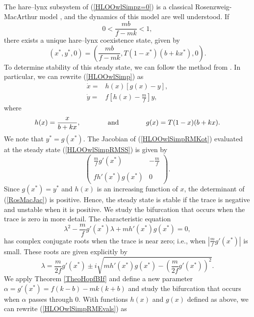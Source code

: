\documentclass[12pt]{UOthesis}
\theoremstyle{remarkstyle}
\begin{document}
The hare--lynx subsystem of (\ref{HLOOwlSimpz=0}) is a classical Rosenzweig-MacArthur model \cite{RosMac}, and the dynamics of this model are well understood. If
$$0<\frac{mb}{f-mk}<1,$$
there exists a unique hare--lynx coexistence state, given by
\begin{equation}
(x^*,y^*,0)=\left(\frac{mb}{f-mk}, T(1-x^*)(b+kx^*),0\right).
\label{HLOOwlSimpRMSS}
\end{equation}
To determine stability of this steady state, we can follow the method from \cite{Kot}. In particular, we can rewrite (\ref{HLOOwlSimp}) as
\begin{equation}
	\begin{split}
		\dot{x}=& h(x)\left[g(x)-y\right],\\
		\dot{y}=& f\left[h(x)-\frac{m}{f}\right]y,
	\end{split}
	\label{HLOOwlSimpRMKot}
\end{equation}
where
$$h(x)=\frac{x}{b+kx},\hspace{0.5in}\text{ and }\hspace{0.5in} g(x)=T(1-x)(b+kx).$$
We note that $y^*=g(x^*)$. The Jacobian of (\ref{HLOOwlSimpRMKot}) evaluated at the steady state (\ref{HLOOwlSimpRMSS}) is given by
\begin{equation}
	\begin{pmatrix}
	\frac{m}{f}g'(x^*) & -\frac{m}{f}\\ \\
	fh'(x^*)g(x^*) & 0
	\end{pmatrix}.
	\label{RosMacJac}
\end{equation}
Since $g(x^*)=y^*$ and $h(x)$ is an increasing function of $x$, the determinant of (\ref{RosMacJac}) is positive. Hence, the steady state is stable if the trace is negative and unstable when it is positive. We study the bifurcation that occurs when the trace is zero in more detail. The characteristic equation
$$\lambda^2-\frac{m}{f}g'(x^*)\lambda+mh'(x^*)g(x^*)=0,$$
has complex conjugate roots when the trace is near zero; i.e., when $|\frac{m}{f} g'(x^*)|$ is small. These roots are given explicitly by
\begin{equation}
	\lambda=\frac{m}{2f}g'(x^*)\pm i\sqrt{mh'(x^*)g(x^*)-\left(\frac{m}{2f}g'(x^*)\right)^2}.
	\label{HLOOwlSimpRMEvals}
\end{equation}
We apply Theorem \ref{TheoHopfBIf} and define a new parameter $\alpha=g'(x^*)=f(k-b)-mk(k+b)$ and study the bifurcation that occurs when $\alpha$ passes through 0.
With functions $h(x)$ and $g(x)$ defined as above, we can rewrite (\ref{HLOOwlSimpRMEvals}) as
\end{document}

